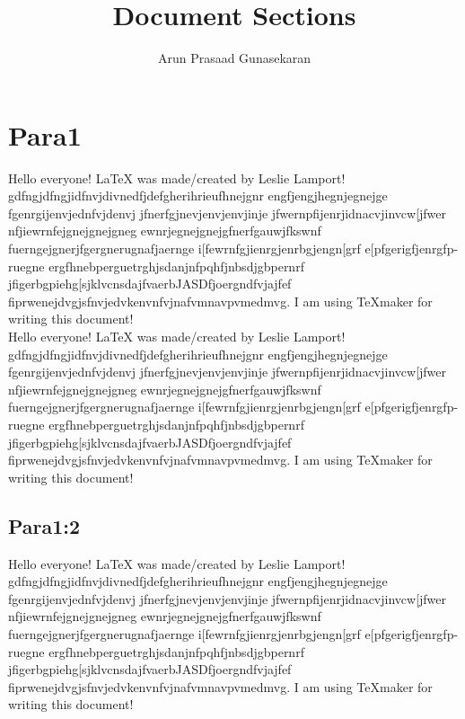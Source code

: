 \documentclass[10pt,a4paper]{article}
\author{Arun Prasaad Gunasekaran}
\title{Document Sections}
\begin{document}
\maketitle

\tableofcontents

\newpage

\section{Para1}
Hello everyone! LaTeX was made/created by Leslie Lamport! gdfngjdfngjidfnvjdivnedfjdefgherihrieufhnejgnr engfjengjhegnjegnejge fgenrgijenvjednfvjdenvj jfnerfgjnevjenvjenvjinje jfwernpfijenrjidnacvjinvcw[jfwer nfjiewrnfejgnejgnejgneg ewnrjegnejgnejgfnerfgauwjfkswnf fuerngejgnerjfgergnerugnafjaernge i[fewrnfgjienrgjenrbgjengn[grf e[pfgerigfjenrgfp-ruegne ergfhnebperguetrghjsdanjnfpqhfjnbsdjgbpernrf jfigerbgpiehg[sjklvcnsdajfvaerbJASDfjoergndfvjajfef fiprwenejdvgjsfnvjedvkenvnfvjnafvmnavpvmedmvg. 
I am using TeXmaker for writing this document!\\

Hello everyone! LaTeX was made/created by Leslie Lamport! gdfngjdfngjidfnvjdivnedfjdefgherihrieufhnejgnr engfjengjhegnjegnejge fgenrgijenvjednfvjdenvj jfnerfgjnevjenvjenvjinje jfwernpfijenrjidnacvjinvcw[jfwer nfjiewrnfejgnejgnejgneg ewnrjegnejgnejgfnerfgauwjfkswnf fuerngejgnerjfgergnerugnafjaernge i[fewrnfgjienrgjenrbgjengn[grf e[pfgerigfjenrgfp-ruegne ergfhnebperguetrghjsdanjnfpqhfjnbsdjgbpernrf jfigerbgpiehg[sjklvcnsdajfvaerbJASDfjoergndfvjajfef fiprwenejdvgjsfnvjedvkenvnfvjnafvmnavpvmedmvg. 
I am using TeXmaker for writing this document!\\

\subsection{Para1:2}

Hello everyone! LaTeX was made/created by Leslie Lamport! gdfngjdfngjidfnvjdivnedfjdefgherihrieufhnejgnr engfjengjhegnjegnejge fgenrgijenvjednfvjdenvj jfnerfgjnevjenvjenvjinje jfwernpfijenrjidnacvjinvcw[jfwer nfjiewrnfejgnejgnejgneg ewnrjegnejgnejgfnerfgauwjfkswnf fuerngejgnerjfgergnerugnafjaernge i[fewrnfgjienrgjenrbgjengn[grf e[pfgerigfjenrgfp-ruegne ergfhnebperguetrghjsdanjnfpqhfjnbsdjgbpernrf jfigerbgpiehg[sjklvcnsdajfvaerbJASDfjoergndfvjajfef fiprwenejdvgjsfnvjedvkenvnfvjnafvmnavpvmedmvg. 
I am using TeXmaker for writing this document!\\
\end{document}
